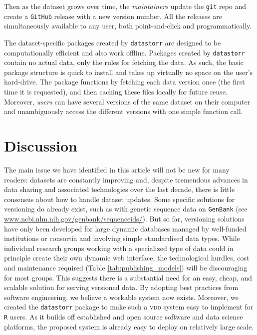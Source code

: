 \documentclass[a4paper,11pt]{article}
\newcommand{\smurl}[1]{{\footnotesize\href{https://#1}{#1}}}
\begin{document}
Then as the dataset grows over time, the \emph{maintainers} update the \texttt{git} repo and create a \texttt{GitHub} release with a new version number. All the releases are simultaneously available to any user, both point-and-click and programmatically.

The dataset-specific packages created by \texttt{datastorr} are designed to be computationally efficient and also work offline. Packages created by \texttt{datastorr} contain no actual data, only the rules for fetching the data. As such, the basic package structure is quick to install and takes up virtually no space on the user's hard-drive. The package functions by fetching each data version once (the first time it is requested), and then caching these files locally for future reuse. Moreover, \emph{users} can have several versions of the same dataset on their computer and unambiguously access the different versions with one simple function call.

\section{Discussion}

The main issue we have identified in this article will not be new for many readers: datasets are constantly improving and, despite tremendous advances in data sharing and associated technologies over the last decade, there is little consensus about how to handle dataset updates. Some specific solutions for versioning do already exist, such as with genetic sequence data on \texttt{GenBank} (see \smurl{www.ncbi.nlm.nih.gov/genbank/sequenceids/}). But so far, versioning solutions have only been developed for large dynamic databases managed by well-funded institutions or consortia and involving simple standardised data types. While individual research groups working with a specialized type of data could in principle create their own dynamic web interface, the technological hurdles, cost and maintenance required (Table \ref{tab:publishing_models}) will be discouraging for most groups. This suggests there is a substantial need for an easy, cheap, and scalable solution for serving versioned data. By adopting best practices from software engineering, we believe a workable system now exists. Moreover, we created the \texttt{datastorr} package to make such a \textsc{vdd} system easy to implement for \texttt{R} users. As it builds off established and open source software and data science platforms, the proposed system is already easy to deploy on relatively large scale.
\end{document}
